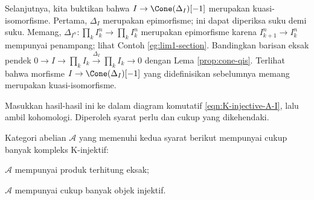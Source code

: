 \begin{bukti}
	Selanjutnya, kita buktikan bahwa $I\to\Cone(\Delta_I)[-1]$ merupakan
	kuasi-isomorfisme. Pertama, $\Delta_I$ merupakan epimorfisme; ini dapat
	diperiksa suku demi suku. Memang,
	$\Delta_{I^n}:\prod_k I_k^n\to\prod_k I_k^n$ merupakan epimorfisme karena
	$I_{k+1}^n\to I_k^n$ mempunyai penampang; lihat Contoh
	\ref{eg:lim1-section}. Bandingkan barisan eksak pendek
	$0\to I\to\prod_k I_k\xrightarrow{\Delta_I}\prod_k I_k\to0$
	dengan Lema \ref{prop:cone-qis}. Terlihat bahwa morfisme
	$I\to\Cone(\Delta_I)[-1]$ yang didefinisikan sebelumnya memang merupakan
	kuasi-isomorfisme.

	Masukkan hasil-hasil ini ke dalam diagram komutatif
	\eqref{eqn:K-injective-A-I}, lalu ambil kohomologi. Diperoleh syarat perlu
	dan cukup yang dikehendaki.
\end{bukti}

\begin{teorema}\label{prop:K-injective-resolution}
	Kategori abelian $\mathcal{A}$ yang memenuhi kedua syarat berikut mempunyai
	cukup banyak kompleks K-injektif:
	\begin{compactitem}
		\item $\mathcal{A}$ mempunyai produk terhitung eksak;
		\item $\mathcal{A}$ mempunyai cukup banyak objek injektif.
	\end{compactitem}
\end{teorema}

